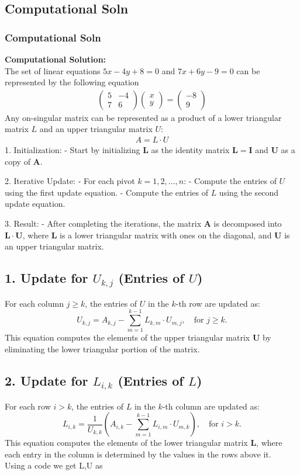 \documentclass{beamer}
\theoremstyle{remark}
\newcommand{\myvec}[1]{\ensuremath{\begin{pmatrix}#1\end{pmatrix}}}
\numberwithin{equation}{section}
\begin{document}
\subsection{Computational Soln}
\begin{frame}
    \frametitle{Computational Soln}
    \textbf{Computational Solution:}\\
The set of linear equations $5x-4y+8=0$ and $7x+6y-9=0$ can be represented by the following equation
\begin{align}
    \myvec{5&-4\\7&6}\myvec{x\\y}=\myvec{-8\\9}
\end{align}
Any on-singular matrix can be represented as a product of a lower triangular matrix $L$ and an
upper triangular matrix $U$:
\begin{align}
    A = L \cdot U
\end{align}
1. Initialization: 
   - Start by initializing $ \mathbf{L} $ as the identity matrix $ \mathbf{L} = \mathbf{I} $ and $ \mathbf{U} $ as a copy of $ \mathbf{A} $.
   
2. Iterative Update:
   - For each pivot $ k = 1, 2, \ldots, n $:
     - Compute the entries of $ U $ using the first update equation.
     - Compute the entries of $ L $ using the second update equation.

3. Result:
   - After completing the iterations, the matrix $ \mathbf{A} $ is decomposed into $ \mathbf{L} \cdot \mathbf{U} $, where $ \mathbf{L} $ is a lower triangular matrix with ones on the diagonal, and $ \mathbf{U} $ is an upper triangular matrix.
\end{frame}
\begin{frame}
\subsection*{1. Update for $ U_{k,j} $ (Entries of $ U $)}

For each column $ j \geq k $, the entries of $ U $ in the $ k $-th row are updated as:
\[
U_{k,j} = A_{k,j} - \sum_{m=1}^{k-1} L_{k,m} \cdot U_{m,j}, \quad \text{for } j \geq k.
\]
This equation computes the elements of the upper triangular matrix $ \mathbf{U} $ by eliminating the lower triangular portion of the matrix.

\subsection*{2. Update for $ L_{i,k} $ (Entries of $ L $)}

For each row $ i > k $, the entries of $ L $ in the $ k $-th column are updated as:
\[
L_{i,k} = \frac{1}{U_{k,k}} \left( A_{i,k} - \sum_{m=1}^{k-1} L_{i,m} \cdot U_{m,k} \right), \quad \text{for } i > k.
\]
This equation computes the elements of the lower triangular matrix $ \mathbf{L} $, where each entry in the column is determined by the values in the rows above it.\\
Using a code we get L,U as 
\end{frame}
\end{document}
